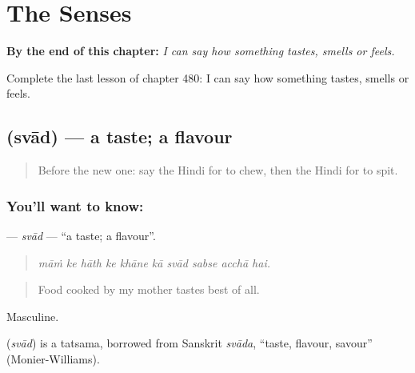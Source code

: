 
\chapter{The Senses}
\label{ch:hi-the-senses}

\begin{chapteropening}
\textbf{By the end of this chapter:} \emph{I can say how something tastes, smells or feels.}

Complete the last lesson of chapter 480: I can say how something tastes, smells or feels.
\end{chapteropening}

\section[\texorpdfstring{\hi{स्वाद} (svād)}{स्वाद (svād)}]{ (svād) — a taste; a flavour}

\label{lesson:HI-C480-svad}



\begin{quote}
Before the new one: say the Hindi for to chew, then the Hindi for to spit.
\end{quote}

\subsection*{You'll want to know: }
\textbf{} — \emph{svād} — \textquotedblleft{}a taste; a flavour\textquotedblright{}.

\begin{quote}
         
\end{quote}

\begin{quote}
\emph{māṁ ke hāth ke khāne kā svād sabse acchā hai.}
\end{quote}

\begin{quote}
Food cooked by my mother tastes best of all.
\end{quote}

Masculine.

\begin{cousinweb}
\textbf{} (\emph{svād}) is a tatsama, borrowed from Sanskrit \emph{svāda}, \textquotedblleft{}taste, flavour, savour\textquotedblright{} (Monier-Williams).
\end{cousinweb}

